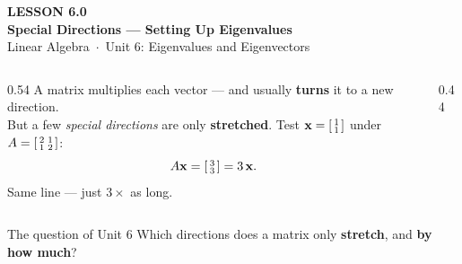 \documentclass[aspectratio=169, 11pt]{beamer}
\newcommand{\xx}{\mathbf{x}}
\newcommand{\yy}{\mathbf{y}}
\begin{document}
{
\begin{frame}[plain]
  \vspace{2.8cm}\hspace{0.55cm}%
  \begin{minipage}{0.9\textwidth}
    {\color{goldacc}\bfseries\small LESSON 6.0}\\[0.5cm]
    {\color{white}\bfseries\LARGE Special Directions --- Setting Up Eigenvalues}\\[1.0cm]
    {\color{blushmid}\small Linear Algebra~$\cdot$~Unit 6: Eigenvalues and Eigenvectors}
  \end{minipage}
\end{frame}
}

\begin{frame}[t, plain]
  \begin{columns}[T]
    \begin{column}{0.54\textwidth}
      A matrix multiplies each vector --- and usually \textbf{turns} it to a new direction.\\[8pt]
      But a few \emph{special directions} are only \textbf{stretched}. Test
      $\xx=\begin{bsmallmatrix} 1\\1 \end{bsmallmatrix}$ under $A=\begin{bsmallmatrix} 2 & 1\\ 1 & 2 \end{bsmallmatrix}$:
      \[ A\xx=\begin{bsmallmatrix} 3\\3 \end{bsmallmatrix}=3\,\xx. \]
      Same line --- just $3\times$ as long.
    \end{column}
    \begin{column}{0.44\textwidth}
      \centering
    \end{column}
  \end{columns}
  \vspace{2pt}
  \begin{block}{The question of Unit 6}
    Which directions does a matrix only \textbf{stretch}, and \textbf{by how much}?
  \end{block}
\end{frame}
\end{document}

